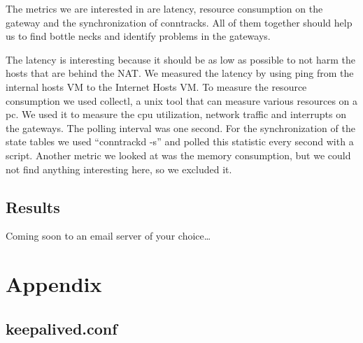 \documentclass{report}
\begin{document}
The metrics we are interested in are latency, resource consumption on
the gateway and the synchronization of conntracks. All of them together
should help us to find bottle necks and identify problems in the
gateways.

The latency is interesting because it should be as low as possible to
not harm the hosts that are behind the NAT. We measured the latency by
using ping\cite{ping} from the internal hosts VM to the Internet Hosts VM.
To measure the resource consumption we used collectl\cite{collectl}, a unix tool that
can measure various resources on a pc. We used it to measure the cpu
utilization, network traffic and interrupts on the gateways. The polling
interval was one second. For the synchronization of the state tables we
used ``conntrackd -s'' and polled this statistic every second with a
script. Another metric we looked at was the memory consumption, but we
could not find anything interesting here, so we excluded it.

\section{Results}\label{results}

Coming soon to an email server of your choice\ldots{}

\chapter{Appendix}\label{appendix}

\section{keepalived.conf}\label{keepalived-1}
\end{document}
